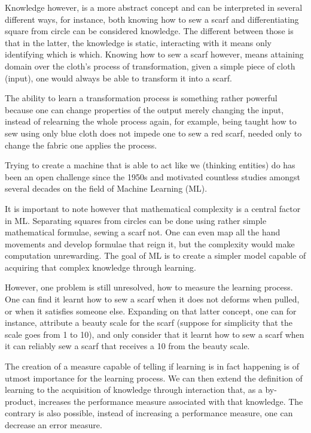 Knowledge however, is a more abstract concept and can be interpreted in several different ways, for instance, both knowing how to sew a scarf and differentiating square from circle can be considered knowledge. The different between those is that in the latter, the knowledge is static, interacting with it means only identifying which is which. Knowing how to sew a scarf however, means attaining domain over the cloth's process of transformation, given a simple piece of cloth (input), one would always be able to transform it into a scarf.

The ability to learn a transformation process is something rather powerful because one can change properties of the output merely changing the input, instead of relearning the whole process again, for example, being taught how to sew using only blue cloth does not impede one to sew a red scarf, needed only to change the fabric one applies the process.

Trying to create a machine that is able to act like we (thinking entities) do has been an open challenge since the 1950s \cite{turingCOMPUTINGMACHINERYINTELLIGENCE1950} and motivated countless studies amongst several decades on the field of Machine Learning (ML).

It is important to note however that mathematical complexity is a central factor in ML. Separating squares from circles can be done using rather simple mathematical formulae, sewing a scarf not. One can even map all the hand movements and develop formulae that reign it, but the complexity would make computation unrewarding. The goal of ML is to create a simpler model capable of acquiring that complex knowledge through learning.

However, one problem is still unresolved, how to measure the learning process. One can find it learnt how to sew a scarf when it does not deforms when pulled, or when it satisfies someone else. Expanding on that latter concept, one can for instance, attribute a beauty scale for the scarf (suppose for simplicity that the scale goes from 1 to 10), and only consider that it learnt how to sew a scarf when it can reliably sew a scarf that receives a 10 from the beauty scale.

The creation of a measure capable of telling if learning is in fact happening is of utmost importance for the learning process. We can then extend the definition of learning to the acquisition of knowledge through interaction that, as a by-product, increases the performance measure associated with that knowledge. The contrary is also possible, instead of increasing a performance measure, one can decrease an error measure.

